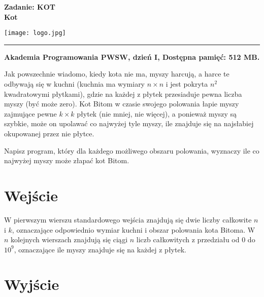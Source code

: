 \documentclass[10pt]{article}
\begin{document}
    

    \noindent
    \begin{minipage}{0.5\textwidth}
        \LARGE{\textsf{\textbf{Zadanie: KOT\\Kot}}}
    \end{minipage}
    \begin{minipage}{0.5\textwidth}
        \begin{flushright}
            \texttt{[image: logo.jpg]}
        \end{flushright}
    \end{minipage}
    
    \noindent\rule{\textwidth}{0.4pt}
    
    \noindent\textbf{Akademia Programowania PWSW, dzień I, Dostępna pamięć: 512 MB.}
    \vspace{1em}
    
    
    \noindent
    Jak powszechnie wiadomo, kiedy kota nie ma, myszy harcują, a harce te odbywają się w kuchni (kuchnia ma wymiary $n \times n$ i jest pokryta $n^{2}$ kwadratowymi płytkami), gdzie na każdej z płytek przesiaduje pewna liczba myszy (być może zero). Kot Bitom w czasie swojego polowania łapie myszy zajmujące pewne $k \times k$ płytek (nie mniej, nie więcej), a ponieważ myszy są szybkie, może on upolawać co najwyżej tyle myszy, ile znajduje się na najsłabiej okupowanej przez nie płytce.

    Napisz program, który dla każdego możliwego obszaru polowania, wyznaczy ile co najwyżej myszy może złapać kot Bitom.


    \section*{Wejście}
    
    W pierwszym wierszu standardowego wejścia znajdują się dwie liczby całkowite $n$ i $k$, oznaczające odpowiednio wymiar kuchni i obszar polowania kota Bitoma. W $n$ kolejnych wierszach znajdują się ciągi $n$ liczb całkowitych z przedziału od 0 do $10^{9}$, oznaczające ile myszy znajduje się na każdej z płytek.


    \section*{Wyjście}
    
\end{document}
